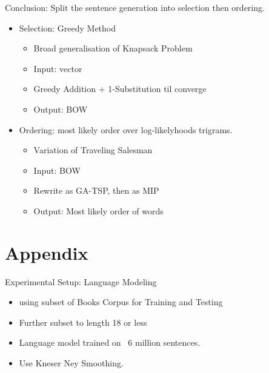\documentclass[]{beamer}
\newcommand{\x}{\tilde{x}}
\newcommand{\V}{\mathcal{V}}
\newcommand{\B}{\mathcal{B}}
\newcommand{\s}{w_{\blacktriangleright}}
\begin{document}


\begin{frame}{Conclusion: Split the sentence generation into selection then ordering.}
	\begin{itemize}
		\item<1->Selection: Greedy Method
		\begin{itemize}
			\item Broad generalisation of Knapsack Problem
			\item Input: vector
			\item Greedy Addition + 1-Substitution til converge
			\item Output: BOW
		\end{itemize}
		\vfill
		\item<2->Ordering: most likely order over log-likelyhoods trigrams.
		\begin{itemize}
			\item Variation of Traveling Salesman
			\item Input: BOW
			\item Rewrite as GA-TSP, then as MIP
			\item Output: Most likely order of words
		\end{itemize}
	\end{itemize}
\end{frame}

\section{Appendix}

\begin{frame}{Experimental Setup: Language Modeling}
	\begin{itemize}
		\item using subset of Books Corpus for Training and Testing
		\item<1-> Further subset to length 18 or less
		\vfill
		\item<2-> Language model trained on ~6 million sentences.
		\item<2-> Use Kneser Ney Smoothing. 
		
	\end{itemize}
\end{frame}



\newcommand{\vectorselectionproblemdefnalt}{Find the bag of vectors $\B$ (a multi-subset of $\V$), such that $\displaystyle \Sigma(\B)=\sum_{\x_a\in\B}\x_a$ we have  $\min d(\s,\Sigma(\B))$}
\end{document}
